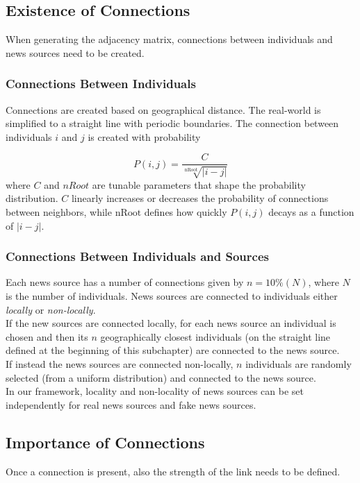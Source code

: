 \subsection{Existence of Connections}
\label{subsec:connections_existence}
When generating the adjacency matrix, connections between individuals and news sources need to be created.
\subsubsection{Connections Between Individuals}
\label{subsub: connections}
Connections are created based on geographical distance. The real-world is simplified to a straight line with periodic boundaries. The connection between individuals $i$ and $j$ is created with probability 

\begin{equation}
P(i,j) = \frac{C}{\sqrt[\text{nRoot}]{\vert i-j\vert}}
\end{equation}
where $C$ and $nRoot$ are tunable parameters that shape the probability distribution. $C$ linearly increases or decreases the probability of connections between neighbors, while $\text{nRoot}$ defines how quickly $P(i,j)$ decays as a function of $\vert i-j \vert$.

\subsubsection{Connections Between Individuals and Sources}
Each news source has a number of connections given by $n = 10\% (N)$, where $N$ is the number of individuals.
News sources are connected to individuals either \textit{locally} or \textit{non-locally}. 
\\If the new sources are connected locally, for each news source an individual is chosen and then its $n$ geographically closest individuals (on the straight line defined at the beginning of this subchapter) are connected to the news source.
\\If instead the news sources are connected non-locally, $n$ individuals are randomly selected (from a uniform distribution) and connected to the news source.
\\In our framework, locality and non-locality of news sources can be set independently for real news sources and fake news sources.



\subsection{Importance of Connections}
Once a connection is present, also the strength of the link needs to be defined.


